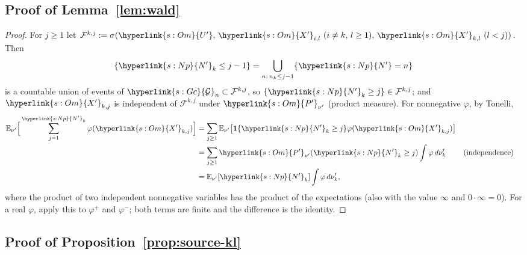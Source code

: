 \documentclass[11pt]{article}
\newcommand{\sy}[2]{\hyperlink{#1}{#2}}
\newcommand{\E}{\mathbb{E}}
\newcommand{\ind}{\mathbf{1}}
\newcommand{\Gc}{\sy{s:Gc}{\mathcal{G}}}
\newcommand{\Np}{\sy{s:Np}{N'}}
\newcommand{\Up}{\sy{s:Om}{U'}}
\newcommand{\Xp}{\sy{s:Om}{X'}}
\newcommand{\Pp}{\sy{s:Om}{P'}}
\begin{document}
\subsection{Proof of Lemma~\ref{lem:wald}}\label{sec:proof-wald}

\begin{proof}
For $j\ge1$ let $\mathcal F^{k,j}:=\sigma(\Up,\,\Xp_{i,l}\ (i\ne k,\,l\ge1),\,\Xp_{k,l}\ (l<j))$. Then
\begin{equation*}
\{\Np_k\le j-1\}=\bigcup_{n:\,n_k\le j-1}\{\Np=n\}
\end{equation*}
is a countable union of events of $\Gc_n\subset\mathcal F^{k,j}$, so $\{\Np_k\ge j\}\in\mathcal F^{k,j}$;
and $\Xp_{k,j}$ is independent of $\mathcal F^{k,j}$ under $\Pp_{\nu'}$ (product measure). For
nonnegative $\varphi$, by Tonelli,
\begin{align*}
\E_{\nu'}\Big[\sum_{j=1}^{\Np_k}\varphi(\Xp_{k,j})\Big]
&=\sum_{j\ge1}\E_{\nu'}\big[\ind\{\Np_k\ge j\}\varphi(\Xp_{k,j})\big]\\
&=\sum_{j\ge1}\Pp_{\nu'}(\Np_k\ge j)\int\varphi\,d\nu'_k && \text{(independence)}\\
&=\E_{\nu'}[\Np_k]\int\varphi\,d\nu'_k,
\end{align*}
where the product of two independent nonnegative variables has the product of the expectations
(also with the value $\infty$ and $0\cdot\infty=0$). For a real $\varphi$, apply this to
$\varphi^+$ and $\varphi^-$; both terms are finite and the difference is the identity.
\end{proof}

\subsection{Proof of Proposition~\ref{prop:source-kl}}\label{sec:proof-source-kl}
\end{document}
